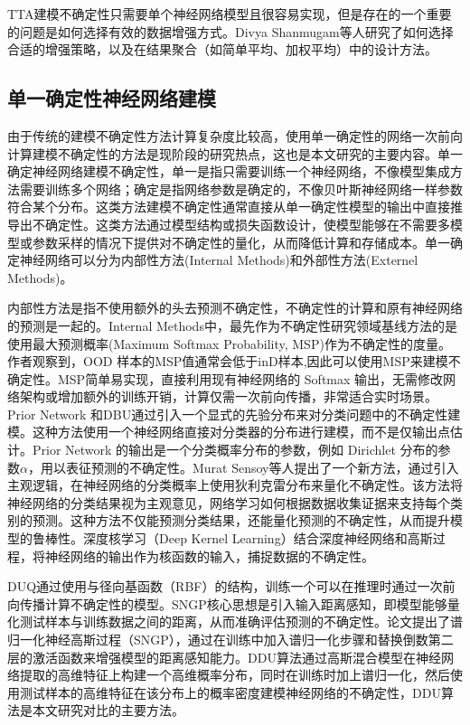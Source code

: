 TTA建模不确定性只需要单个神经网络模型且很容易实现，但是存在的一个重要的问题是如何选择有效的数据增强方式。Divya Shanmugam等人\cite{shanmugam2020and}研究了如何选择合适的增强策略，以及在结果聚合（如简单平均、加权平均）中的设计方法。




\subsection{单一确定性神经网络建模}
由于传统的建模不确定性方法计算复杂度比较高，使用单一确定性的网络一次前向计算建模不确定性的方法是现阶段的研究热点，这也是本文研究的主要内容。单一确定神经网络建模不确定性，单一是指只需要训练一个神经网络，不像模型集成方法需要训练多个网络；确定是指网络参数是确定的，不像贝叶斯神经网络一样参数符合某个分布。这类方法建模不确定性通常直接从单一确定性模型的输出中直接推导出不确定性。这类方法通过模型结构或损失函数设计，使模型能够在不需要多模型或参数采样的情况下提供对不确定性的量化，从而降低计算和存储成本。单一确定神经网络可以分为内部性方法(Internal Methods)\cite{oala2020interval}和外部性方法(Externel Methods)\cite{gawlikowski2023survey}。

内部性方法是指不使用额外的头去预测不确定性，不确定性的计算和原有神经网络的预测是一起的。Internal Methods中，最先作为不确定性研究领域基线方法的是使用最大预测概率\cite{hendrycks2017a}(Maximum Softmax Probability, MSP)作为不确定性的度量。作者观察到，OOD 样本的MSP值通常会低于inD样本,因此可以使用MSP来建模不确定性。MSP简单易实现，直接利用现有神经网络的 Softmax 输出，无需修改网络架构或增加额外的训练开销，计算仅需一次前向传播，非常适合实时场景。Prior Network\cite{malinin2018predictive} 和DBU\cite{kopetzki2021evaluating}通过引入一个显式的先验分布来对分类问题中的不确定性建模。这种方法使用一个神经网络直接对分类器的分布进行建模，而不是仅输出点估计。Prior Network 的输出是一个分类概率分布的参数，例如 Dirichlet 分布的参数$\alpha$，用以表征预测的不确定性。Murat Sensoy等人\cite{sensoy2018evidential}提出了一个新方法，通过引入主观逻辑，在神经网络的分类概率上使用狄利克雷分布来量化不确定性。该方法将神经网络的分类结果视为主观意见，网络学习如何根据数据收集证据来支持每个类别的预测。这种方法不仅能预测分类结果，还能量化预测的不确定性，从而提升模型的鲁棒性。深度核学习（Deep Kernel Learning）\cite{van2021feature}结合深度神经网络和高斯过程，将神经网络的输出作为核函数的输入，捕捉数据的不确定性。

DUQ\cite{van2020uncertainty}通过使用与径向基函数（RBF）的结构，训练一个可以在推理时通过一次前向传播计算不确定性的模型。SNGP\cite{liu2020simple}核心思想是引入输入距离感知，即模型能够量化测试样本与训练数据之间的距离，从而准确评估预测的不确定性。论文提出了谱归一化神经高斯过程（SNGP），通过在训练中加入谱归一化\cite{yoshida2017spectral}步骤和替换倒数第二层的激活函数来增强模型的距离感知能力。DDU算法\cite{Mukhoti_2023_CVPR}通过高斯混合模型在神经网络提取的高维特征上构建一个高维概率分布，同时在训练时加上谱归一化，然后使用测试样本的高维特征在该分布上的概率密度建模神经网络的不确定性，DDU算法是本文研究对比的主要方法。

